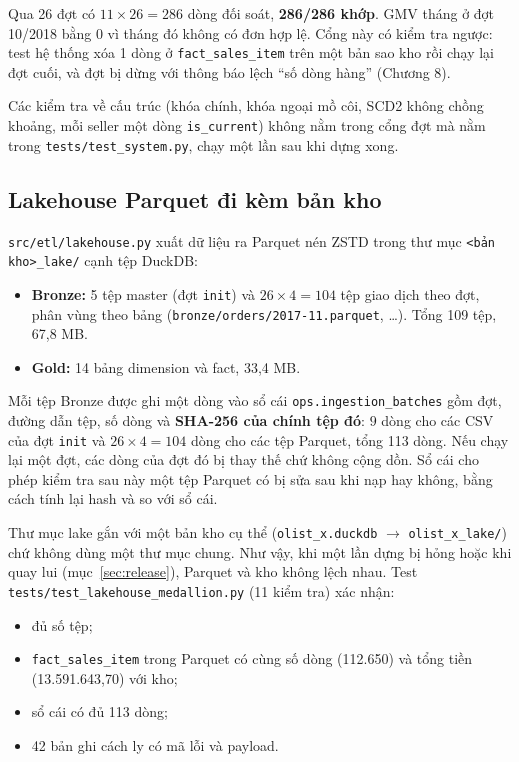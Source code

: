 Qua 26 đợt có $11 \times 26 = 286$ dòng đối soát, \textbf{286/286 khớp}. GMV tháng ở đợt 10/2018 bằng 0 vì tháng đó không có đơn hợp lệ. Cổng này có kiểm tra ngược: test hệ thống xóa 1 dòng ở \texttt{fact\_sales\_item} trên một bản sao kho rồi chạy lại đợt cuối, và đợt bị dừng với thông báo lệch ``số dòng hàng'' (Chương 8).

Các kiểm tra về cấu trúc (khóa chính, khóa ngoại mồ côi, SCD2 không chồng khoảng, mỗi seller một dòng \texttt{is\_current}) không nằm trong cổng đợt mà nằm trong \texttt{tests/test\_system.py}, chạy một lần sau khi dựng xong.

\subsection{Lakehouse Parquet đi kèm bản kho}
\texttt{src/etl/lakehouse.py} xuất dữ liệu ra Parquet nén ZSTD trong thư mục \texttt{<bản kho>\_lake/} cạnh tệp DuckDB:
\begin{itemize}
    \item \textbf{Bronze:} 5 tệp master (đợt \texttt{init}) và $26 \times 4 = 104$ tệp giao dịch theo đợt, phân vùng theo bảng (\texttt{bronze/orders/2017-11.parquet}, \dots). Tổng 109 tệp, 67,8 MB.
    \item \textbf{Gold:} 14 bảng dimension và fact, 33,4 MB.
\end{itemize}
Mỗi tệp Bronze được ghi một dòng vào sổ cái \texttt{ops.ingestion\_batches} gồm đợt, đường dẫn tệp, số dòng và \textbf{SHA-256 của chính tệp đó}: $9$ dòng cho các CSV của đợt \texttt{init} và $26 \times 4 = 104$ dòng cho các tệp Parquet, tổng 113 dòng. Nếu chạy lại một đợt, các dòng của đợt đó bị thay thế chứ không cộng dồn. Sổ cái cho phép kiểm tra sau này một tệp Parquet có bị sửa sau khi nạp hay không, bằng cách tính lại hash và so với sổ cái.

Thư mục lake gắn với một bản kho cụ thể (\texttt{olist\_x.duckdb} $\rightarrow$ \texttt{olist\_x\_lake/}) chứ không dùng một thư mục chung. Như vậy, khi một lần dựng bị hỏng hoặc khi quay lui (mục~\ref{sec:release}), Parquet và kho không lệch nhau. Test \texttt{tests/test\_lakehouse\_medallion.py} (11 kiểm tra) xác nhận:
\begin{itemize}
    \item đủ số tệp;
    \item \texttt{fact\_sales\_item} trong Parquet có cùng số dòng (112.650) và tổng tiền (13.591.643,70) với kho;
    \item sổ cái có đủ 113 dòng;
    \item 42 bản ghi cách ly có mã lỗi và payload.
\end{itemize}


